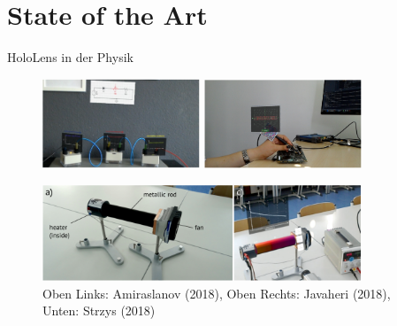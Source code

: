 \part{State of the Art}
\label{part:sota}
\begin{frame}[fragile]{HoloLens in der Physik}
\vspace{0.1cm}
\pause
\begin{figure}
	\includegraphics[width=0.42\textwidth]{images/papers/Amiraslanov18.png}
	\includegraphics[width=0.42\textwidth]{images/papers/Javaheri18.png}
	\begin{center}
	\vspace{0.03cm}
	\includegraphics[width=0.85\textwidth]{images/papers/Strzys18.png}	
	\end{center}
	\setlength{\abovecaptionskip}{7pt plus 5pt minus 2pt}
	\caption*{Oben Links: Amiraslanov (2018), Oben Rechts: Javaheri (2018), Unten: Strzys (2018)}
\end{figure}
\end{frame}

